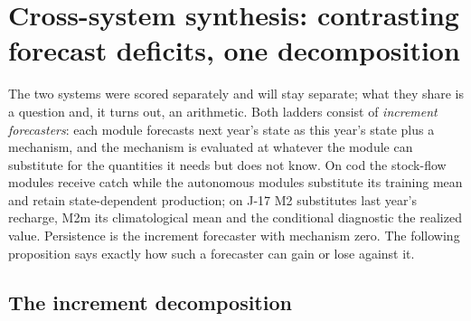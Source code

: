 \documentclass[preprint,11pt,authoryear]{elsarticle}
\theoremstyle{definition}
\theoremstyle{remark}
\begin{document}
\section{Cross-system synthesis: contrasting forecast deficits, one decomposition}\label{sec:synthesis}

The two systems were scored separately and will stay separate; what they share is a question and, it turns out, an arithmetic. Both ladders consist of \emph{increment forecasters}: each module forecasts next year's state as this year's state plus a mechanism, and the mechanism is evaluated at whatever the module can substitute for the quantities it needs but does not know. On cod the stock-flow modules receive catch while the autonomous modules substitute its training mean and retain state-dependent production; on J-17 M2 substitutes last year's recharge, M2m its climatological mean and the conditional diagnostic the realized value. Persistence is the increment forecaster with mechanism zero. The following proposition says exactly how such a forecaster can gain or lose against it.

\subsection{The increment decomposition}\label{sec:decomp}
\end{document}
